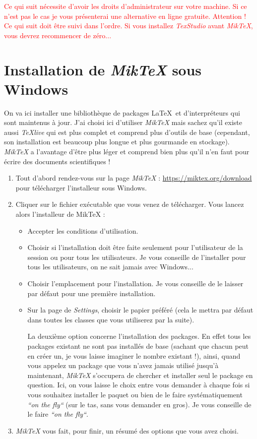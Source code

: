 \documentclass[11pt,a4paper]{article} %
\begin{document}
\textcolor{red}{Ce qui suit nécessite d'avoir les droits d'administrateur sur votre machine. Si ce n'est pas le cas je vous présenterai une alternative en ligne gratuite. Attention ! Ce qui suit doit être suivi dans l'ordre. Si vous installez \textit{TexStudio} avant \textit{MikTeX}, vous devrez recommencer de zéro...}

\section{Installation de \textit{MikTeX} sous Windows}
On va ici installer une bibliothèque de packages \LaTeX\ et d'interpréteurs qui sont maintenus à jour. J'ai choisi ici d'utiliser \textit{MikTeX} mais sachez qu'il existe aussi \textit{TeXlive} qui est plus complet et comprend plus d'outils de base (cependant, son installation est beaucoup plus longue et plus gourmande en stockage). \textit{MikTeX} a l'avantage d'être plus léger et comprend bien plus qu'il n'en faut pour écrire des documents scientifiques !

\begin{enumerate}
	\item Tout d'abord rendez-vous sur la page \textit{MikTeX} : \url{https://miktex.org/download} pour télécharger l'installeur sous Windows.
	\item Cliquer sur le fichier exécutable que vous venez de télécharger. Vous lancez alors l'installeur de MikTeX :
	\begin{itemize}
		\item Accepter les conditions d'utilisation.
		\item Choisir si l'installation doit être faite seulement pour l'utilisateur de la session ou pour tous les utilisateurs. Je vous conseille de l'installer pour tous les utilisateurs, on ne sait jamais avec Windows...
		\item Choisir l'emplacement pour l'installation. Je vous conseille de le laisser par défaut pour une première installation.
		\item Sur la page de \textit{Settings}, choisir le papier préféré (cela le mettra par défaut dans toutes les classes que vous utiliserez par la suite).

		La deuxième option concerne l'installation des packages. En effet tous les packages existant ne sont pas installés de base (sachant que chacun peut en créer un, je vous laisse imaginer le nombre existant !), ainsi, quand vous appelez un package que vous n'avez jamais utilisé jusqu'à maintenant, \textit{MikTeX} s'occupera de chercher et installer seul le package en question. Ici, on vous laisse le choix entre vous demander à chaque fois si vous souhaitez installer le paquet ou bien de le faire systématiquement \textit{``on the fly``} (sur le tas, sans vous demander en gros). Je vous conseille de le faire \textit{``on the fly``}.
	\end{itemize}
		\item \textit{MikTeX} vous fait, pour finir, un résumé des options que vous avez choisi.
\end{enumerate}
\end{document}
